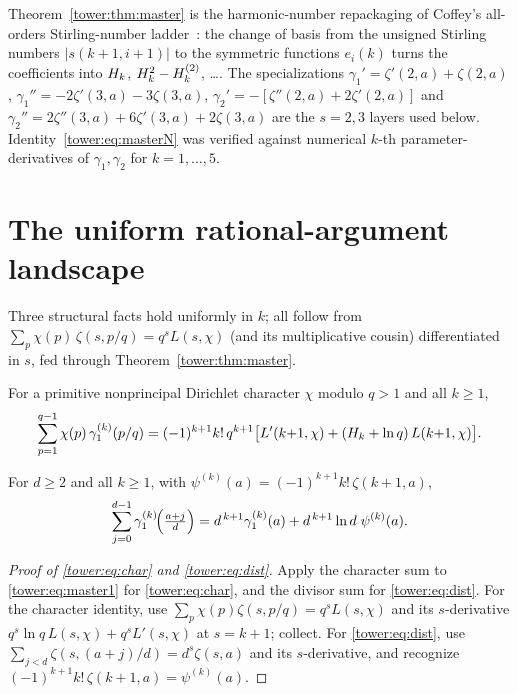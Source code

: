 Theorem~\ref{tower:thm:master} is the harmonic-number repackaging of Coffey's
all-orders Stirling-number ladder~\cite{stieltjes:Coffey}: the change of basis from
the unsigned Stirling numbers $\bigl|s(k{+}1,i{+}1)\bigr|$ to the symmetric
functions $e_i(k)$ turns the coefficients into $H_{k}$, $H_{k}^2-H_{k}^{(2)}$,
\dots. The specializations $\gamma_1'=\zeta'(2,a)+\zeta(2,a)$,
$\gamma_1''=-2\zeta'(3,a)-3\zeta(3,a)$,
$\gamma_2'=-[\zeta''(2,a)+2\zeta'(2,a)]$ and
$\gamma_2''=2\zeta''(3,a)+6\zeta'(3,a)+2\zeta(3,a)$ are the $s=2,3$ layers used
below. Identity~\eqref{tower:eq:masterN} was verified against numerical $k$-th
parameter-derivatives of $\gamma_1,\gamma_2$ for $k=1,\dots,5$.




\section{The uniform rational-argument landscape}\label{tower:sec:landscape}

Three structural facts hold uniformly in $k$; all follow from
$\sum_{p}\chi(p)\,\zeta(s,p/q)=q^{s}L(s,\chi)$ (and its multiplicative cousin)
differentiated in $s$, fed through Theorem~\ref{tower:thm:master}.

\begin{proposition}\label{tower:prop:char}
For a primitive nonprincipal Dirichlet character $\chi$ modulo $q>1$ and all $k\ge1$,
\begin{equation}\label{tower:eq:char}
  \sum_{p=1}^{q-1}\chi(p)\,\gamma_1^{(k)}(p/q)
   =(-1)^{k+1}k!\,q^{k+1}\bigl[L'(k{+}1,\chi)+(H_{k}+\ln q)\,L(k{+}1,\chi)\bigr].
\end{equation}
\end{proposition}

\begin{proposition}\label{tower:prop:dist}
For $d\ge2$ and all $k\ge1$, with $\psi^{(k)}(a)=(-1)^{k+1}k!\,\zeta(k{+}1,a)$,
\begin{equation}\label{tower:eq:dist}
  \sum_{j=0}^{d-1}\gamma_1^{(k)}\!\Bigl(\tfrac{a+j}{d}\Bigr)
   =d^{\,k+1}\gamma_1^{(k)}(a)+d^{\,k+1}\ln d\;\psi^{(k)}(a).
\end{equation}
\end{proposition}

\begin{proof}[Proof of \eqref{tower:eq:char} and \eqref{tower:eq:dist}]
Apply the character sum to \eqref{tower:eq:master1} for
\eqref{tower:eq:char}, and the divisor sum for \eqref{tower:eq:dist}.
For the character identity, use
$\sum_p\chi(p)\zeta(s,p/q)=q^sL(s,\chi)$ and its $s$-derivative
$q^s\ln q\,L(s,\chi)+q^sL'(s,\chi)$ at $s=k{+}1$; collect. For \eqref{tower:eq:dist},
use $\sum_{j<d}\zeta(s,(a{+}j)/d)=d^s\zeta(s,a)$ and its $s$-derivative, and
recognize $(-1)^{k+1}k!\,\zeta(k{+}1,a)=\psi^{(k)}(a)$.
\end{proof}

